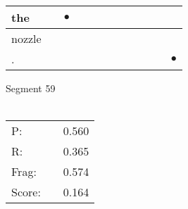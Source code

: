 \documentclass[landscape]{article}
\newcommand{\ssp}{\hspace{2pt}}
\newcommand{\mex}{\cellcolor{g}$\bullet$}
\begin{document}
\begin{tabular}{|l|p{10pt}|p{10pt}|p{10pt}|p{10pt}|p{10pt}|p{10pt}|p{10pt}|p{10pt}|p{10pt}|p{10pt}|p{10pt}|}
\hline
\ssp \cellcolor{ref1}the \ssp&\hspace{2pt}&\hspace{2pt}\mex&\hspace{2pt}&\hspace{2pt}&\hspace{2pt}&\hspace{2pt}&\hspace{2pt}&\hspace{2pt}&\hspace{2pt}&\hspace{2pt}&\hspace{2pt}\\
\hline
\ssp nozzle \ssp&\hspace{2pt}&\hspace{2pt}&\hspace{2pt}&\hspace{2pt}&\hspace{2pt}&\hspace{2pt}&\hspace{2pt}&\hspace{2pt}&\hspace{2pt}&\hspace{2pt}&\hspace{2pt}\\
\hline
\ssp \cellcolor{ref10}. \ssp&\hspace{2pt}&\hspace{2pt}&\hspace{2pt}&\hspace{2pt}&\hspace{2pt}&\hspace{2pt}&\hspace{2pt}&\hspace{2pt}&\hspace{2pt}&\hspace{2pt}&\hspace{2pt}\mex\\
\hline
\end{tabular}

\vspace{6pt}
\noindent Segment 59\\\\
\noindent\begin{tabular}{lm{12pt}r}
\hline
P:&&0.560\\
R:&&0.365\\
Frag:&&0.574\\
Score:&&0.164\\
\end{tabular}
\end{document}
